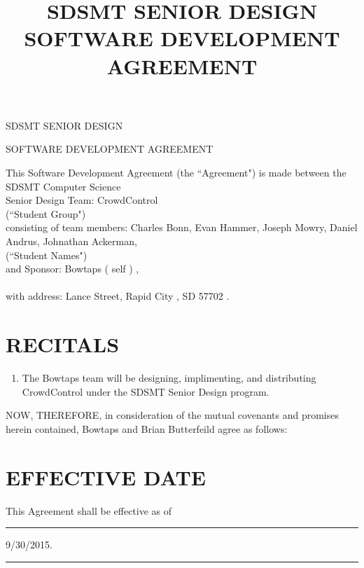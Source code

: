 \documentclass[11pt]{article}
\title{SDSMT SENIOR DESIGN SOFTWARE DEVELOPMENT AGREEMENT}
\begin{document}


{\Large \bf 
\centerline{SDSMT SENIOR DESIGN}\centerline{SOFTWARE DEVELOPMENT AGREEMENT}
}
\vspace{\baselineskip}

This Software Development Agreement (the ``Agreement") is made between the SDSMT  Computer Science\\[3mm] Senior Design Team:  \hrulefill CrowdControl \hrulefill \\[-1mm]   \hspace*{9cm} {\footnotesize (``Student Group")}\\[3mm]
consisting of team members:  \hrulefill Charles Bonn, Evan Hammer, Joseph Mowry, Daniel Andrus, Johnathan Ackerman\hrulefill,  \\[-1mm]  \hspace*{9cm} {\footnotesize (``Student Names")}\\[3mm]
 and  Sponsor: \hrulefill Bowtaps ( self ) \hrulefill,  \\[-1mm]  \hspace*{9cm}{\footnotesize  (``Company Name")} \\[3mm]
 with address:  Lance Street, Rapid City , SD 57702 \hrulefill . 



\section{RECITALS}
\begin{enumerate}  \itemsep4pt \parskip0pt 
\item The Bowtaps team will be designing, implimenting, and distributing CrowdControl under the SDSMT Senior Design program.

 
\end{enumerate}
NOW, THEREFORE, in consideration of the mutual covenants and promises herein contained, Bowtaps and Brian Butterfeild agree as follows:  

\section{EFFECTIVE DATE }

This Agreement shall be effective as of \rule{1cm}{0.4pt}  9/30/2015.   \rule{1cm}{0.4pt}
\end{document}

